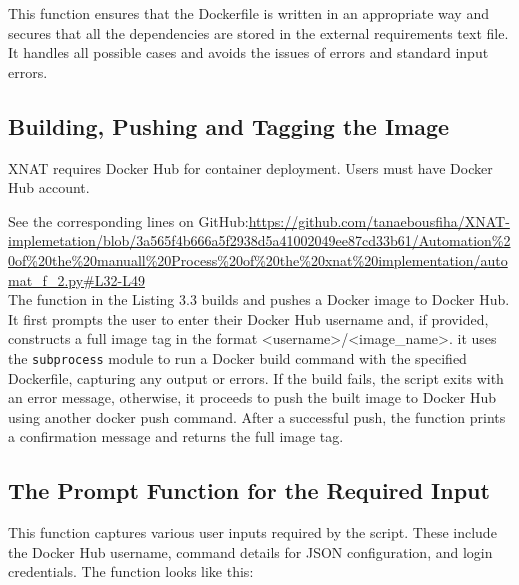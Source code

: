 This function ensures that the Dockerfile is written in an appropriate way and secures that all the dependencies are stored in the external requirements text file. It handles all possible cases and avoids the issues of errors and standard input errors.

\subsection{Building, Pushing and Tagging the Image}

XNAT requires Docker Hub for container deployment. Users must have Docker Hub account. 



\noindent\footnotesize See the corresponding lines on GitHub:\url{https://github.com/tanaebousfiha/XNAT-implemetation/blob/3a565f4b666a5f2938d5a41002049ee87cd33b61/Automation%20of%20the%20manuall%20Process%20of%20the%20xnat%20implementation/automat_f_2.py#L32-L49}
\normalsize
\\
The function in the Listing 3.3 builds and pushes a Docker image to Docker Hub. It first prompts the user to enter their Docker Hub username and, if provided, constructs a full image tag in the format <username>/<image\_name>. it uses the \texttt{subprocess} module to run a Docker build command with the specified Dockerfile, capturing any output or errors. If the build fails, the script exits with an error message, otherwise, it proceeds to push the built image to Docker Hub using another docker push command. After a successful push, the function prints a confirmation message and returns the full image tag.



\subsection{The Prompt Function for the Required Input}

This function captures various user inputs required by the script. These include the Docker Hub username, command details for JSON configuration, and login credentials.
The function looks like this:
 


